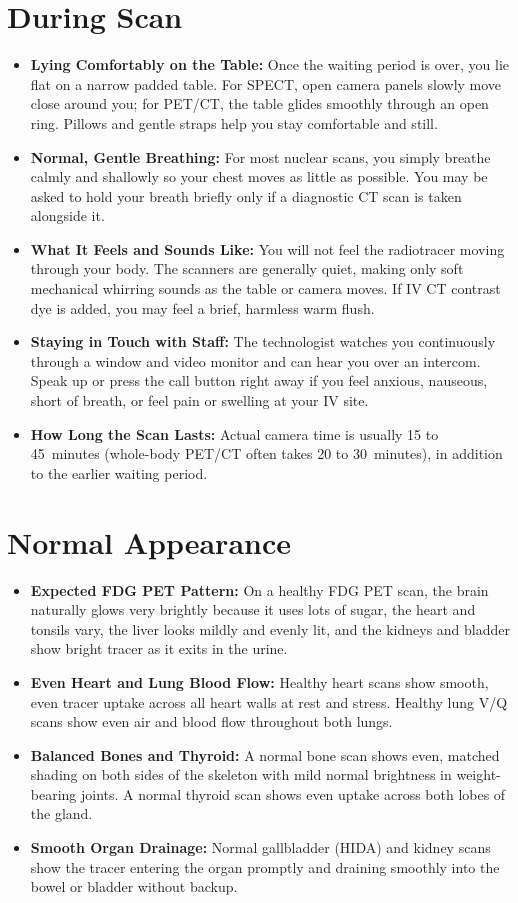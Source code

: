 \section{During Scan}
\begin{itemize}
  \item \textbf{Lying Comfortably on the Table:} Once the waiting period is over, you lie flat on a narrow padded table. For SPECT, open camera panels slowly move close around you; for PET/CT, the table glides smoothly through an open ring. Pillows and gentle straps help you stay comfortable and still.
  \item \textbf{Normal, Gentle Breathing:} For most nuclear scans, you simply breathe calmly and shallowly so your chest moves as little as possible. You may be asked to hold your breath briefly only if a diagnostic CT scan is taken alongside it.
  \item \textbf{What It Feels and Sounds Like:} You will not feel the radiotracer moving through your body. The scanners are generally quiet, making only soft mechanical whirring sounds as the table or camera moves. If IV CT contrast dye is added, you may feel a brief, harmless warm flush.
  \item \textbf{Staying in Touch with Staff:} The technologist watches you continuously through a window and video monitor and can hear you over an intercom. Speak up or press the call button right away if you feel anxious, nauseous, short of breath, or feel pain or swelling at your IV site.
  \item \textbf{How Long the Scan Lasts:} Actual camera time is usually 15 to 45~minutes (whole-body PET/CT often takes 20 to 30~minutes), in addition to the earlier waiting period.
\end{itemize}

\section{Normal Appearance}
\begin{itemize}
  \item \textbf{Expected FDG PET Pattern:} On a healthy FDG PET scan, the brain naturally glows very brightly because it uses lots of sugar, the heart and tonsils vary, the liver looks mildly and evenly lit, and the kidneys and bladder show bright tracer as it exits in the urine.
  \item \textbf{Even Heart and Lung Blood Flow:} Healthy heart scans show smooth, even tracer uptake across all heart walls at rest and stress. Healthy lung V/Q scans show even air and blood flow throughout both lungs.
  \item \textbf{Balanced Bones and Thyroid:} A normal bone scan shows even, matched shading on both sides of the skeleton with mild normal brightness in weight-bearing joints. A normal thyroid scan shows even uptake across both lobes of the gland.
  \item \textbf{Smooth Organ Drainage:} Normal gallbladder (HIDA) and kidney scans show the tracer entering the organ promptly and draining smoothly into the bowel or bladder without backup.
\end{itemize}

